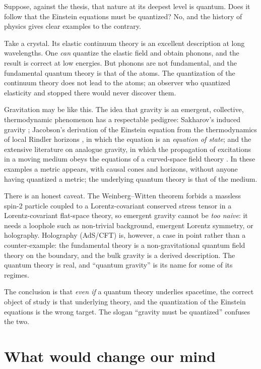 Suppose, against the thesis, that nature at its deepest level is quantum.
Does it follow that the Einstein equations must be quantized? No, and
the history of physics gives clear examples to the contrary.

Take a crystal. Its elastic continuum theory is an excellent
description at long wavelengths. One \emph{can} quantize the elastic field
and obtain phonons, and the result is correct at low energies. But
phonons are not fundamental, and the fundamental quantum theory is that of
the atoms. The quantization of the continuum theory does not lead to the
atoms; an observer who quantized elasticity and stopped there would
never discover them.

Gravitation may be like this. The idea that gravity is an emergent,
collective, thermodynamic phenomenon has a respectable pedigree:
Sakharov's induced gravity \cite{qg:sakharov}; Jacobson's derivation of the
Einstein equation from the thermodynamics of local Rindler horizons
\cite{qg:jacobson}, in which the equation is an \emph{equation of state};
and the extensive literature on analogue gravity, in which the
propagation of excitations in a moving medium obeys the equations of
a curved-space field theory \cite{qg:analogue}. In these examples a
metric appears, with causal cones and horizons, without anyone having
quantized a metric; the underlying quantum theory is that of the medium.

There is an honest caveat. The Weinberg--Witten theorem \cite{qg:ww}
forbids a massless spin-2 particle coupled to a Lorentz-covariant
conserved stress tensor in a Lorentz-covariant flat-space theory, so
emergent gravity cannot be \emph{too naive}: it needs a loophole such as
non-trivial background, emergent Lorentz symmetry, or holography.
Holography (AdS/CFT) is, however, a case in point rather than a
counter-example: the fundamental theory is a non-gravitational quantum
field theory on the boundary, and the bulk gravity is a derived
description. The quantum theory is real, and ``quantum gravity'' is its
name for some of its regimes.

The conclusion is that \emph{even if} a quantum theory underlies spacetime,
the correct object of study is that underlying theory, and the
quantization of the Einstein equations is the wrong target. The slogan
``gravity must be quantized'' confuses the two.

\section{What would change our mind}
\label{sec:change-mind}

